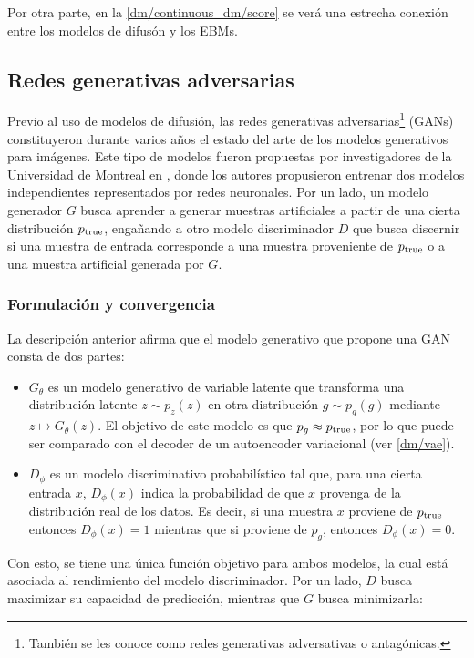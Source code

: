 Por otra parte, en la \autoref{dm/continuous_dm/score} se verá una estrecha conexión entre los modelos de difusón y los EBMs.

\subsection{Redes generativas adversarias}
\label{dm/generative_models/gans}

Previo al uso de modelos de difusión, las redes generativas adversarias\footnote{También se les conoce como redes generativas adversativas o antagónicas.} (GANs) constituyeron durante varios años el estado del arte de los modelos generativos para imágenes. Este tipo de modelos fueron propuestas por investigadores de la Universidad de Montreal en \cite{goodfellow2014generative}, donde los autores propusieron entrenar dos modelos independientes representados por redes neuronales. Por un lado, un modelo generador $G$ busca aprender a generar muestras artificiales a partir de una cierta distribución $p_{\operatorname{true}}$, engañando a otro modelo discriminador $D$ que busca discernir si una muestra de entrada corresponde a una muestra proveniente de $p_{\operatorname{true}}$ o a una muestra artificial generada por $G$.

\subsubsection{Formulación y convergencia}

La descripción anterior afirma que el modelo generativo que propone una GAN consta de dos partes:

\begin{itemize}
	\item $G_\theta$ es un modelo generativo de variable latente que transforma una distribución latente $z\sim p_z(z)$ en otra distribución $g\sim p_g(g)$ mediante $z\mapsto G_\theta(z)$. El objetivo de este modelo es que $p_g\approx p_{\operatorname{true}}$, por lo que puede ser comparado con el decoder de un autoencoder variacional (ver \autoref{dm/vae}).
	\item $D_\phi$ es un modelo discriminativo probabilístico tal que, para una cierta entrada $x$, $D_\phi(x)$ indica la probabilidad de que $x$ provenga de la distribución real de los datos. Es decir, si una muestra $x$ proviene de $p_{\operatorname{true}}$ entonces $D_\phi(x)=1$ mientras que si proviene de $p_g$, entonces $D_\phi(x)=0$. \end{itemize}

Con esto, se tiene una única función objetivo para ambos modelos, la cual está asociada al rendimiento del modelo discriminador. Por un lado, $D$ busca maximizar su capacidad de predicción, mientras que $G$ busca minimizarla:

